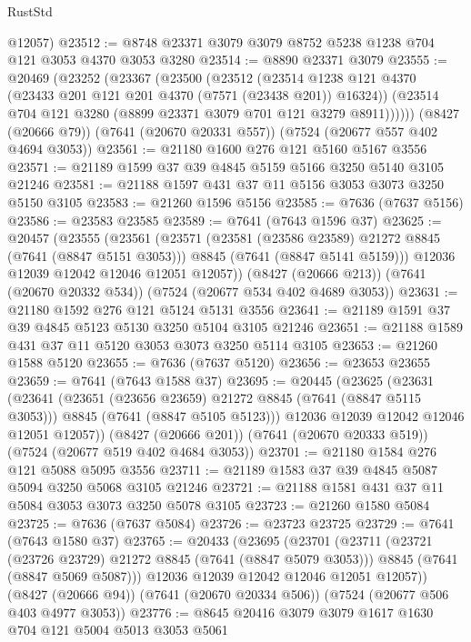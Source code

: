 \begin{lexlean}{RustStd}
\begin{coremodule}
      @12057)
@23512 := @8748 @23371 @3079 @3079 @8752 @5238 @1238 @704 @121 @3053 @4370 @3053 @3280
@23514 := @8890 @23371 @3079
@23555 := @20469
    (@23252
      (@23367
        (@23500
          (@23512
            (@23514 @1238 @121 @4370 (@23433 @201 @121 @201 @4370 (@7571 (@23438 @201)) @16324))
            (@23514 @704 @121 @3280 (@8899 @23371 @3079 @701 @121 @3279 @8911))))))
    (@8427 (@20666 @79))
    (@7641 (@20670 @20331 @557))
    (@7524 (@20677 @557 @402 @4694 @3053))
@23561 := @21180 @1600 @276 @121 @5160 @5167 @3556
@23571 := @21189 @1599 @37 @39 @4845 @5159 @5166 @3250 @5140 @3105 @21246
@23581 := @21188 @1597 @431 @37 @11 @5156 @3053 @3073 @3250 @5150 @3105
@23583 := @21260 @1596 @5156
@23585 := @7636 (@7637 @5156)
@23586 := @23583 @23585
@23589 := @7641 (@7643 @1596 @37)
@23625 := @20457
    (@23555
      (@23561
        (@23571
          (@23581 (@23586 @23589) @21272 @8845 (@7641 (@8847 @5151 @3053)))
          @8845
          (@7641 (@8847 @5141 @5159)))
        @12036
        @12039
        @12042
        @12046
        @12051
        @12057))
    (@8427 (@20666 @213))
    (@7641 (@20670 @20332 @534))
    (@7524 (@20677 @534 @402 @4689 @3053))
@23631 := @21180 @1592 @276 @121 @5124 @5131 @3556
@23641 := @21189 @1591 @37 @39 @4845 @5123 @5130 @3250 @5104 @3105 @21246
@23651 := @21188 @1589 @431 @37 @11 @5120 @3053 @3073 @3250 @5114 @3105
@23653 := @21260 @1588 @5120
@23655 := @7636 (@7637 @5120)
@23656 := @23653 @23655
@23659 := @7641 (@7643 @1588 @37)
@23695 := @20445
    (@23625
      (@23631
        (@23641
          (@23651 (@23656 @23659) @21272 @8845 (@7641 (@8847 @5115 @3053)))
          @8845
          (@7641 (@8847 @5105 @5123)))
        @12036
        @12039
        @12042
        @12046
        @12051
        @12057))
    (@8427 (@20666 @201))
    (@7641 (@20670 @20333 @519))
    (@7524 (@20677 @519 @402 @4684 @3053))
@23701 := @21180 @1584 @276 @121 @5088 @5095 @3556
@23711 := @21189 @1583 @37 @39 @4845 @5087 @5094 @3250 @5068 @3105 @21246
@23721 := @21188 @1581 @431 @37 @11 @5084 @3053 @3073 @3250 @5078 @3105
@23723 := @21260 @1580 @5084
@23725 := @7636 (@7637 @5084)
@23726 := @23723 @23725
@23729 := @7641 (@7643 @1580 @37)
@23765 := @20433
    (@23695
      (@23701
        (@23711
          (@23721 (@23726 @23729) @21272 @8845 (@7641 (@8847 @5079 @3053)))
          @8845
          (@7641 (@8847 @5069 @5087)))
        @12036
        @12039
        @12042
        @12046
        @12051
        @12057))
    (@8427 (@20666 @94))
    (@7641 (@20670 @20334 @506))
    (@7524 (@20677 @506 @403 @4977 @3053))
@23776 := @8645 @20416 @3079 @3079 @1617 @1630 @704 @121 @5004 @5013 @3053 @5061

\end{coremodule}
\end{lexlean}
